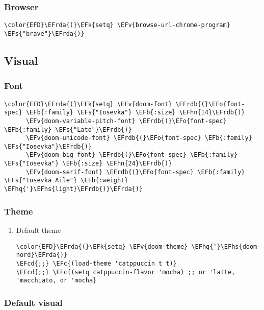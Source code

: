 \documentclass[12pt]{article}
\theoremstyle{plain}%
\theoremstyle{definition}
\theoremstyle{remark}
\newcommand{\EFc}[1]{\textcolor{EFc}{#1}} %
\newcommand{\EFcd}[1]{\textcolor{EFcd}{#1}} %
\newcommand{\EFs}[1]{\textcolor{EFs}{#1}} %
\newcommand{\EFk}[1]{\textcolor{EFk}{#1}} %
\newcommand{\EFb}[1]{\textcolor{EFb}{#1}} %
\newcommand{\EFv}[1]{\textcolor{EFv}{#1}} %
\newcommand{\EFo}[1]{\textcolor{EFo}{#1}} %
\newcommand{\EFhn}[1]{\textcolor{EFhn}{\textbf{#1}}} %
\newcommand{\EFhq}[1]{\textcolor{EFhq}{#1}} %
\newcommand{\EFhs}[1]{\textcolor{EFhs}{#1}} %
\newcommand{\EFrda}[1]{\textcolor{EFrda}{#1}} %
\newcommand{\EFrdb}[1]{\textcolor{EFrdb}{#1}} %
\begin{document}
\subsubsection{Browser}
\label{sec:orgc2b2c64}
\begin{Code}
\begin{Verbatim}
\color{EFD}\EFrda{(}\EFk{setq} \EFv{browse-url-chrome-program} \EFs{"brave"}\EFrda{)}
\end{Verbatim}
\end{Code}
\subsection{Visual}
\label{sec:orgc834731}
\subsubsection{Font}
\label{sec:org407e00a}
\begin{Code}
\begin{Verbatim}
\color{EFD}\EFrda{(}\EFk{setq} \EFv{doom-font} \EFrdb{(}\EFo{font-spec} \EFb{:family} \EFs{"Iosevka"} \EFb{:size} \EFhn{14}\EFrdb{)}
      \EFv{doom-variable-pitch-font} \EFrdb{(}\EFo{font-spec} \EFb{:family} \EFs{"Lato"}\EFrdb{)}
      \EFv{doom-unicode-font} \EFrdb{(}\EFo{font-spec} \EFb{:family} \EFs{"Iosevka"}\EFrdb{)}
      \EFv{doom-big-font} \EFrdb{(}\EFo{font-spec} \EFb{:family} \EFs{"Iosevka"} \EFb{:size} \EFhn{24}\EFrdb{)}
      \EFv{doom-serif-font} \EFrdb{(}\EFo{font-spec} \EFb{:family} \EFs{"Iosevka Aile"} \EFb{:weight} \EFhq{'}\EFhs{light}\EFrdb{)}\EFrda{)}
\end{Verbatim}
\end{Code}
\subsubsection{Theme}
\label{sec:org28169b1}
\begin{enumerate}
\item Default theme
\label{sec:org494cd7c}
\begin{Code}
\begin{Verbatim}
\color{EFD}\EFrda{(}\EFk{setq} \EFv{doom-theme} \EFhq{'}\EFhs{doom-nord}\EFrda{)}
\EFcd{;;} \EFc{(load-theme 'catppuccin t t)}
\EFcd{;;} \EFc{(setq catppuccin-flavor 'mocha) ;; or 'latte, 'macchiato, or 'mocha}
\end{Verbatim}
\end{Code}
\end{enumerate}
\subsubsection{Default visual}
\label{sec:org4ee766e}
\end{document}
